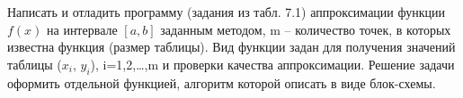 Написать и отладить программу (задания из табл. 7.1) аппроксимации
функции $f(x)$ на интервале $[a, b]$ заданным методом, m – количество точек, в
которых известна функция (размер таблицы). Вид функции задан для
получения значений таблицы ($x_i$, $y_i$), i=1,2,…,m и проверки качества
аппроксимации.
Решение задачи оформить отдельной функцией, алгоритм которой
описать в виде блок-схемы.